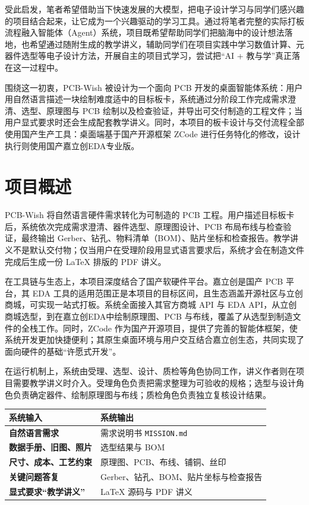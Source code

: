 \documentclass[11pt,a4paper]{ctexart}
\newcommand{\code}[1]{\texttt{\small #1}}
\begin{document}
受此启发，笔者希望借助当下快速发展的大模型，把电子设计学习与同学们感兴趣的项目结合起来，让它成为一个兴趣驱动的学习工具。通过将笔者完整的实际打板流程融入智能体（Agent）系统，项目既希望帮助同学们把脑海中的设计想法落地，也希望通过随附生成的教学讲义，辅助同学们在项目实践中学习数值计算、元器件选型等电子设计方法，开展自主的项目式学习，尝试把“AI + 教与学”真正落在这一过程中。

围绕这一初衷，PCB-Wish 被设计为一个面向 PCB 开发的桌面智能体系统：用户用自然语言描述一块绘制难度适中的目标板卡，系统通过分阶段工作完成需求澄清、选型、原理图与 PCB 绘制以及检查验证，并导出可交付制造的工程文件；当用户显式要求时还会生成配套教学讲义。同时，本项目的板卡设计与交付流程全部使用国产生产工具：桌面端基于国产开源框架 ZCode 进行任务特化的修改，设计执行则使用国产嘉立创EDA专业版。

\section{项目概述}

PCB-Wish 将自然语言硬件需求转化为可制造的 PCB 工程。用户描述目标板卡后，系统依次完成需求澄清、器件选型、原理图设计、PCB 布局布线与检查验证，最终输出 Gerber、钻孔、物料清单（BOM）、贴片坐标和检查报告。教学讲义不是默认交付物；仅当用户在受理阶段用显式语言要求后，系统才会在制造文件完成后生成一份 LaTeX 排版的 PDF 讲义。

在工具链与生态上，本项目深度结合了国产软硬件平台。嘉立创是国产 PCB 平台，其 EDA 工具的适用范围正是本项目的目标区间，且生态涵盖开源社区与立创商城，可实现一站式打板。系统全面接入其官方商城 API 与 EDA API，从立创商城选型，到在嘉立创EDA中绘制原理图、PCB 与布线，覆盖了从选型到制造文件的全栈工作。同时，ZCode 作为国产开源项目，提供了完善的智能体框架，使系统开发更加快捷便利；其原生桌面环境与用户交互结合嘉立创生态，共同实现了面向硬件的基础“许愿式开发”。

在运行机制上，系统由受理、选型、设计、质检等角色协同工作，讲义作者则在项目需要教学讲义时介入。受理角色负责把需求整理为可验收的规格；选型与设计角色负责确定器件、绘制原理图与布线；质检角色负责独立复核设计结果。

\begin{center}
\small
\begin{tabularx}{\linewidth}{@{}>{\bfseries}p{3.8cm} >{\RaggedRight\arraybackslash}X@{}}
\toprule
\rowcolor{okbg}系统输入 & 系统输出 \\
\midrule
自然语言需求 & 需求说明书 \code{MISSION.md} \\
数据手册、旧图、照片 & 选型结果与 BOM \\
尺寸、成本、工艺约束 & 原理图、PCB、布线、铺铜、丝印 \\
关键问题答复 & Gerber、钻孔、BOM、贴片坐标与检查报告 \\
显式要求“教学讲义” & LaTeX 源码与 PDF 讲义 \\
\bottomrule
\end{tabularx}
\end{center}
\end{document}

